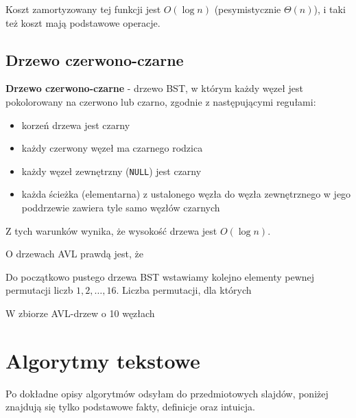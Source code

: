 Koszt zamortyzowany tej funkcji jest $O(\log n)$ (pesymistycznie $\Theta(n)$), i taki też koszt mają podstawowe operacje.

\subsection{Drzewo czerwono-czarne}
\textbf{Drzewo czerwono-czarne} - drzewo BST, w którym każdy węzeł jest pokolorowany na czerwono lub czarno, zgodnie z następującymi regułami:
\begin{itemize}
    \item korzeń drzewa jest czarny
    \item każdy czerwony węzeł ma czarnego rodzica
    \item każdy węzeł zewnętrzny (\texttt{NULL}) jest czarny
    \item każda ścieżka (elementarna) z ustalonego węzła do węzła zewnętrznego w jego poddrzewie zawiera tyle samo węzłów czarnych
\end{itemize}

Z tych warunków wynika, że wysokość drzewa jest $O(\log n)$.

\begin{problems}
    \prob O drzewach AVL prawdą jest, że

    \prob Do początkowo pustego drzewa BST wstawiamy kolejno elementy pewnej permutacji liczb $1,2,\ldots,16$. Liczba permutacji, dla których

    \prob W zbiorze AVL-drzew o 10 węzłach
\end{problems}

\section{Algorytmy tekstowe}
Po dokładne opisy algorytmów odsyłam do przedmiotowych slajdów, poniżej znajdują się tylko podstawowe fakty, definicje oraz intuicja.

